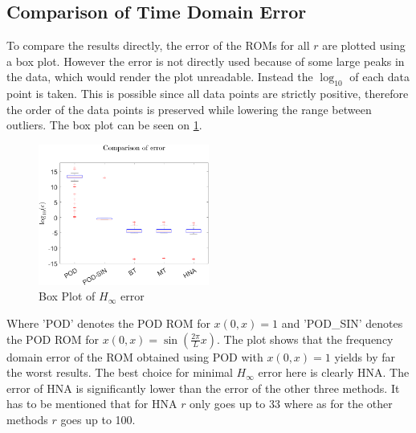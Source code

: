 \subsection{Comparison of Time Domain Error}
To compare the results directly, the error of the ROMs for all \(r\) are plotted using a box plot.
However the error is not directly used because of some large peaks in the data, which would render the plot unreadable.
Instead the \(\log_{10}\) of each data point is taken.
This is possible since all data points are strictly positive, therefore the order of the data points is preserved while lowering the range between outliers.
The box plot can be seen on \ref{FIG-H-BOX}.
\begin{figure}[H]
\centering
\includegraphics[width=0.5\textwidth]{images/freq/H_BOX}
\caption{Box Plot of $H_{\infty}$ error}
\label{FIG-H-BOX}
\end{figure}
Where 'POD' denotes the POD ROM for \(x(0, x) = 1\) and 'POD\_SIN' denotes the POD ROM for \(x(0, x) =  \sin(\frac{2\pi}{L}x)\).
The plot shows that the frequency domain error of the ROM obtained using POD with \(x(0, x) = 1\) yields by far the worst results.
The best choice for minimal \(H_{\infty}\) error here is clearly HNA. 
The error of HNA is significantly lower than the error of the other three methods.
It has to be mentioned that for HNA \(r\) only goes up to 33 where as for the other methods \(r\) goes up to 100.








